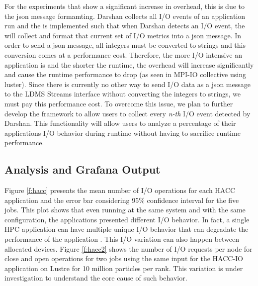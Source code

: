 For the experiments that show a significant increase in overhead, this is due to the json message formamting. Darshan collects all I/O events of an application run and the \connector{} is implemented such that when Darshan detects an I/O event, the \connector{} will collect and format that current set of I/O metrics into a json message. In order to send a json message, all integers must be converted to strings and this conversion comes at a performance cost. Therefore, the more I/O intensive an application is and the shorter the runtime, the overhead will increase significantly and cause the runtime performance to drop (as seen in MPI-IO collective using luster). Since there is currently no other way to send I/O data as a json message to the LDMS Streams interface without converting the integers to strings, we must pay this performance cost. To overcome this issue, we plan to further develop the \Darshan{} framework to allow users to collect every \emph{n-th} I/O event detected by Darshan. This functionality will allow users to analyze a percentage of their applications I/O behavior during runtime without having to sacrifice runtime performance.     


\subsection{Analysis and Grafana Output}
Figure \ref{f:hacc} presents the mean number of I/O operations for
each HACC application and the error bar considering 95\% confidence
interval for the five jobs. This plot shows that even running at the
same system and with the same configuration, the applications
presented different I/O behavior. In fact, a single HPC application
can have multiple unique I/O behavior that can degradate the
performance of the application \cite{costa2021}. This I/O variation
can also happen between allocated devices. Figure \ref{f:hacc2} shows the number of I/O requests per node for close and open operations for two jobs using the same input for the HACC-IO application on Lustre for 10 million particles per rank. This variation is under investigation to understand the core cause of such behavior.

